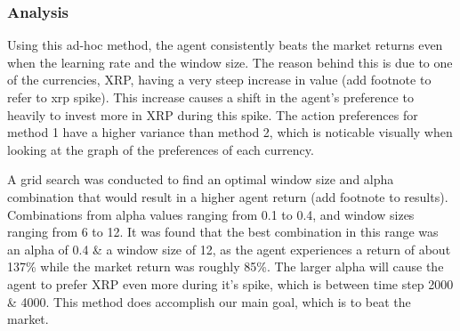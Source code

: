 \documentclass[a4paper,12pt]{article}
\begin{document}
\subsubsection{Analysis}
Using this ad-hoc method, the agent consistently beats the market returns even when the learning rate and the window size. The reason behind this is due to one of the currencies, XRP, having a very steep increase in value (add footnote to refer to xrp spike). This increase causes a shift in the agent’s preference to heavily to invest more in XRP during this spike. The action preferences for method 1 have a higher variance than method 2, which is noticable visually when looking at the graph of the preferences of each currency. 

A grid search was conducted to find an optimal window size and alpha combination that would result in a higher agent return (add footnote to results). Combinations from alpha values ranging from 0.1 to 0.4, and window sizes ranging from 6 to 12. It was found that the best combination in this range was an alpha of 0.4 \& a window size of 12, as the agent experiences a return of about 137\% while the market return was roughly 85\%. The larger alpha will cause the agent to prefer XRP even more during it’s spike, which is between time step 2000 \& 4000.
This method does accomplish our main goal, which is to beat the market.
\end{document}
